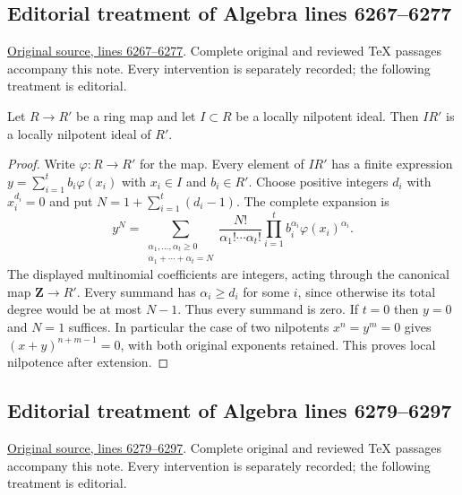 \subsection{Editorial treatment of Algebra lines 6267--6277}

\hypertarget{algebra-context-046}{}

\noindent\href{https://github.com/stacks/stacks-project/blob/a04446e57ec1fbc252a871afcec7752fb2807b14/algebra.tex\#L6267}{Original source, lines 6267--6277}. Complete original and reviewed TeX passages accompany this note. Every intervention is separately recorded; the following treatment is editorial.


\begin{lemma}
\label{editorial-source-lemma-locally-nilpotent}
Let $R \to R'$ be a ring map and let $I \subset R$ be a locally nilpotent
ideal. Then $IR'$ is a locally nilpotent ideal of $R'$.
\end{lemma}

\begin{proof}
Write $\varphi:R\to R'$ for the map. Every element of $IR'$ has a
finite expression $y=\sum_{i=1}^t b_i\varphi(x_i)$ with $x_i\in I$
and $b_i\in R'$. Choose positive integers $d_i$ with $x_i^{d_i}=0$
and put $N=1+\sum_{i=1}^t(d_i-1)$. The complete expansion is
$$
y^N=\sum_{\substack{\alpha_1,\ldots,\alpha_t\geq0\\
\alpha_1+\cdots+\alpha_t=N}}
\frac{N!}{\alpha_1!\cdots\alpha_t!}
\prod_{i=1}^t b_i^{\alpha_i}\varphi(x_i)^{\alpha_i}.
$$
The displayed multinomial coefficients are integers, acting through
the canonical map $\mathbf Z\to R'$. Every summand has
$\alpha_i\geq d_i$ for some $i$, since otherwise its total degree
would be at most $N-1$. Thus every summand is zero. If $t=0$ then
$y=0$ and $N=1$ suffices. In particular the case of two nilpotents
$x^n=y^m=0$ gives $(x+y)^{n+m-1}=0$, with both original exponents
retained. This proves local nilpotence after extension.
\end{proof}


\subsection{Editorial treatment of Algebra lines 6279--6297}

\hypertarget{algebra-context-047}{}

\noindent\href{https://github.com/stacks/stacks-project/blob/a04446e57ec1fbc252a871afcec7752fb2807b14/algebra.tex\#L6279}{Original source, lines 6279--6297}. Complete original and reviewed TeX passages accompany this note. Every intervention is separately recorded; the following treatment is editorial.


